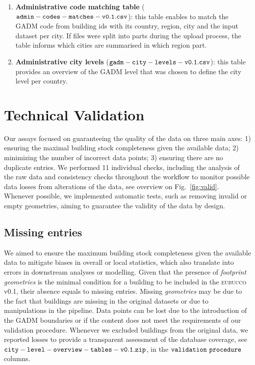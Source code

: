 \documentclass[fleqn,10pt]{wlscirep}
\begin{document}
\begin{enumerate}[topsep=1pt]
    \item \textbf{Administrative code matching table} (${\tt admin-codes-matches-v0.1.csv}$): this table enables to match the GADM code from building ids with its country, region, city and the input dataset per city. If files were split into parts during the upload process, the table informs which cities are summarised in which region part.
    
    \item \textbf{Administrative city levels} (${\tt gadm-city-levels-v0.1.csv}$): this table provides an overview of the GADM level that was chosen to define the city level per country.
    
\end{enumerate}


\section*{Technical Validation}
Our assays focused on guaranteeing the quality of the data on three main axes: 1) ensuring the maximal building stock completeness given the available data; 2) minimizing the number of incorrect data points; 3) ensuring there are no duplicate entries. We performed 11 individual checks, including the analysis of the raw data and consistency checks throughout the workflow to monitor possible data losses from alterations of the data, see overview on Fig.~\ref{fig:valid}. Whenever possible, we implemented automatic tests, such as removing invalid or empty geometries, aiming to guarantee the validity of the data by design.   



\subsection*{Missing entries}

We aimed to ensure the maximum building stock completeness given the available data to mitigate biases in overall or local statistics, which also translate into errors in downstream analyses or modelling. 
Given that the presence of \textit{footprint geometries} is the minimal condition for a building to be included in the \textsc{eubucco} v0.1, their absence equals to missing entries. 
Missing \textit{geometries} may be due to the fact that buildings are missing in the original datasets or due to manipulations in the pipeline. Data points can be lost due to the introduction of the GADM boundaries or if the content does not meet the requirements of our validation procedure. Whenever we excluded buildings from the original data, we reported losses to provide a transparent assessment of the database coverage, see ${\tt city-level-overview-tables-v0.1.zip}$, in the ${\tt validation\ procedure}$ columns.
\end{document}
